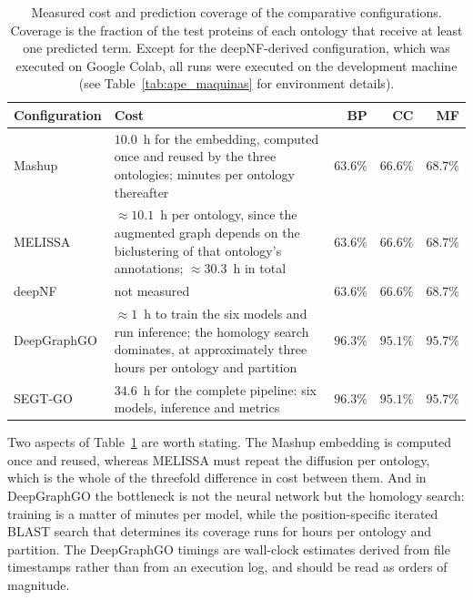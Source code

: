 \documentclass[Ingles]{ic-tese-v3}
\begin{document}
\begin{appendices}{}
\begin{table}[!htb]
  \centering
  \small
  \caption{Measured cost and prediction coverage of the comparative configurations. Coverage is the
  fraction of the test proteins of each ontology that receive at least one predicted term. Except for the deepNF-derived configuration, which was executed on Google Colab, all runs were executed on the development machine (see Table~\ref{tab:ape_maquinas} for environment details).}
  \label{tab:ape_custo_comp}
  \begin{tabular}{lp{5.6cm}rrr}
    \hline
    \textbf{Configuration} & \textbf{Cost} & \textbf{BP} & \textbf{CC} & \textbf{MF} \\
    \hline
    Mashup      & $10.0$~h for the embedding, computed once and reused by the three ontologies;
                  minutes per ontology thereafter & $63.6\%$ & $66.6\%$ & $68.7\%$ \\[2pt]
    MELISSA     & $\approx 10.1$~h per ontology, since the augmented graph depends on the
                  biclustering of that ontology's annotations; $\approx 30.3$~h in total &
                  $63.6\%$ & $66.6\%$ & $68.7\%$ \\[2pt]
    deepNF      & not measured & $63.6\%$ & $66.6\%$ & $68.7\%$ \\[2pt]
    DeepGraphGO & $\approx 1$~h to train the six models and run inference; the homology search
                  dominates, at approximately three hours per ontology and partition &
                  $96.3\%$ & $95.1\%$ & $95.7\%$ \\[2pt]
    SEGT-GO     & $34.6$~h for the complete pipeline: six models, inference and metrics &
                  $96.3\%$ & $95.1\%$ & $95.7\%$ \\
    \hline
  \end{tabular}
\end{table}

Two aspects of Table~\ref{tab:ape_custo_comp} are worth stating. The Mashup embedding is computed
once and reused, whereas MELISSA must repeat the diffusion per ontology, which is the whole of the
threefold difference in cost between them. And in DeepGraphGO the bottleneck is not the neural
network but the homology search: training is a matter of minutes per model, while the position-specific
iterated BLAST search that determines its coverage runs for hours per ontology and partition. The
DeepGraphGO timings are wall-clock estimates derived from file timestamps rather than from an
execution log, and should be read as orders of magnitude.


\end{appendices}
\end{document}
